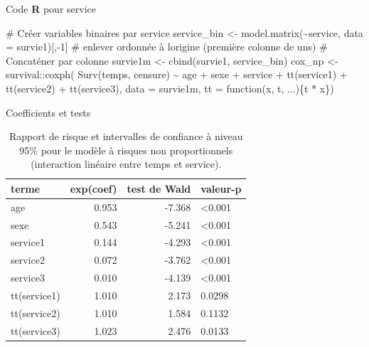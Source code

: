 \documentclass[
  ignorenonframetext,
]{beamer}
\newenvironment{Shaded}{\begin{snugshade}}{\end{snugshade}}
\newcommand{\AttributeTok}[1]{\textcolor[rgb]{0.40,0.45,0.13}{#1}}
\newcommand{\CommentTok}[1]{\textcolor[rgb]{0.37,0.37,0.37}{#1}}
\newcommand{\ControlFlowTok}[1]{\textcolor[rgb]{0.00,0.23,0.31}{#1}}
\newcommand{\DecValTok}[1]{\textcolor[rgb]{0.68,0.00,0.00}{#1}}
\newcommand{\FunctionTok}[1]{\textcolor[rgb]{0.28,0.35,0.67}{#1}}
\newcommand{\NormalTok}[1]{\textcolor[rgb]{0.00,0.23,0.31}{#1}}
\newcommand{\OtherTok}[1]{\textcolor[rgb]{0.00,0.23,0.31}{#1}}
\newcommand{\SpecialCharTok}[1]{\textcolor[rgb]{0.37,0.37,0.37}{#1}}
\begin{document}
\begin{frame}[fragile]{Code \textbf{R} pour service}
\protect\hypertarget{code-r-pour-service}{}
\begin{Shaded}
\begin{Highlighting}[numbers=left,,]
\CommentTok{\# Créer variables binaires par service}
\NormalTok{service\_bin }\OtherTok{\textless{}{-}} \FunctionTok{model.matrix}\NormalTok{(}\SpecialCharTok{\textasciitilde{}}\NormalTok{service, }
                            \AttributeTok{data =}\NormalTok{ survie1)[,}\SpecialCharTok{{-}}\DecValTok{1}\NormalTok{]}
\CommentTok{\# enlever ordonnée à l\textquotesingle{}origine (première colonne de uns)}
\CommentTok{\# Concaténer par colonne}
\NormalTok{survie1m }\OtherTok{\textless{}{-}} \FunctionTok{cbind}\NormalTok{(survie1, service\_bin) }
\NormalTok{cox\_np }\OtherTok{\textless{}{-}}\NormalTok{ survival}\SpecialCharTok{::}\FunctionTok{coxph}\NormalTok{(}
    \FunctionTok{Surv}\NormalTok{(temps, censure) }\SpecialCharTok{\textasciitilde{}} 
\NormalTok{     age }\SpecialCharTok{+}\NormalTok{ sexe }\SpecialCharTok{+}\NormalTok{ service }\SpecialCharTok{+} 
      \FunctionTok{tt}\NormalTok{(service1) }\SpecialCharTok{+} \FunctionTok{tt}\NormalTok{(service2) }\SpecialCharTok{+} \FunctionTok{tt}\NormalTok{(service3), }
     \AttributeTok{data =}\NormalTok{ survie1m, }
     \AttributeTok{tt =} \ControlFlowTok{function}\NormalTok{(x, t, ...)\{t }\SpecialCharTok{*}\NormalTok{ x\})}
\end{Highlighting}
\end{Shaded}
\end{frame}

\begin{frame}{Coefficients et tests}
\protect\hypertarget{coefficients-et-tests}{}
\hypertarget{tbl-cox-nph}{}
\begin{table}
\caption{\label{tbl-cox-nph}Rapport de risque et intervalles de confiance à niveau 95\% pour le
modèle à risques non proportionnels (interaction linéaire entre temps et
service). }\tabularnewline

\centering
\begin{tabular}{lrrl}
\toprule
terme & exp(coef) & test de Wald & valeur-p\\
\midrule
age & 0.953 & -7.368 & <0.001\\
sexe & 0.543 & -5.241 & <0.001\\
service1 & 0.144 & -4.293 & <0.001\\
service2 & 0.072 & -3.762 & <0.001\\
service3 & 0.010 & -4.139 & <0.001\\
\addlinespace
tt(service1) & 1.010 & 2.173 & 0.0298\\
tt(service2) & 1.010 & 1.584 & 0.1132\\
tt(service3) & 1.023 & 2.476 & 0.0133\\
\bottomrule
\end{tabular}
\end{table}
\end{frame}
\end{document}
